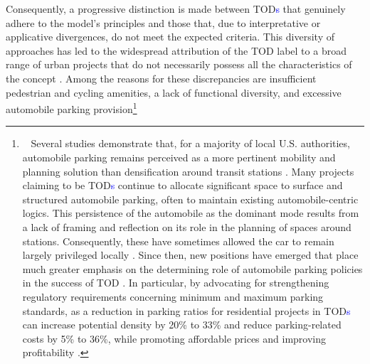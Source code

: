 \begin{refsegment}
Consequently, a progressive distinction is made between \acrshort{TOD}\textcolor{blue}{s} that genuinely adhere to the model's principles and those that, due to interpretative or applicative divergences, do not meet the expected criteria. This diversity of approaches has led to the widespread attribution of the \acrshort{TOD} label to a broad range of urban projects that do not necessarily possess all the characteristics of the concept \textcolor{blue}{\autocite[4]{renne_transit-oriented_2013}}. Among the reasons for these discrepancies are insufficient pedestrian and cycling amenities, a lack of functional diversity, and excessive automobile parking provision\footnote{~
    Several studies demonstrate that, for a majority of local U.S. authorities, automobile parking remains perceived as a more pertinent mobility and planning solution than densification around transit stations \textcolor{blue}{\autocite[106-107]{cervero_tcrp_2004}}. Many projects claiming to be \acrshort{TOD}\textcolor{blue}{s} continue to allocate significant space to surface and structured automobile parking, often to maintain existing automobile-centric logics. This persistence of the automobile as the dominant mode results from a lack of framing and reflection on its role in the planning of spaces around stations. Consequently, these  have sometimes allowed the car to remain largely privileged locally \textcolor{blue}{\autocite[39]{bentayou_transit-oriented_2015}}. Since then, new positions have emerged that place much greater emphasis on the determining role of automobile parking policies in the success of \acrshort{TOD} \textcolor{blue}{\autocite[39]{bentayou_transit-oriented_2015}}. In particular, by advocating for strengthening regulatory requirements concerning minimum and maximum parking standards, as a reduction in parking ratios for residential projects in \acrshort{TOD}\textcolor{blue}{s} can increase potential density by 20\% to 33\% and reduce parking-related costs by 5\% to 36\%, while promoting affordable prices and improving profitability \textcolor{blue}{\autocite[51-54]{arrington_effects_2008}}.
}
\end{refsegment}
